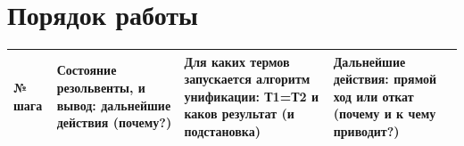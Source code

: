 \documentclass[12pt]{report}
\begin{document}
\section*{Порядок работы}

\begin{table}[H]
	\begin{center}
		\begin{tabular}{|p{0.92 cm}|p{5 cm}|p{6.5 cm}|p{6 cm}|}
			\hline
			№ шага & Состояние резольвенты, и вывод: дальнейшие действия (почему?) & Для каких термов запускается алгоритм унификации: Т1=Т2 и каков результат (и подстановка) & Дальнейшие действия: прямой ход или откат (почему и к чему приводит?) \\
			\hline 
			
		\end{tabular}
	\end{center}
\end{table} 
\end{document}
